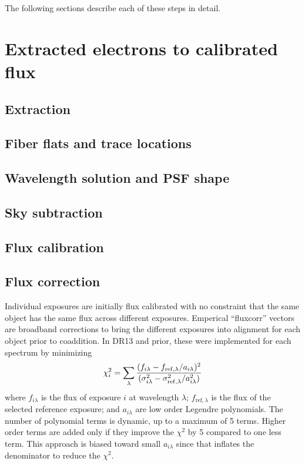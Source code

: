 \documentclass[12pt]{article}
\begin{document}
The following sections describe each of these steps in detail.

\section{Extracted electrons to calibrated flux}

\subsection{Extraction}

\subsection{Fiber flats and trace locations}

\subsection{Wavelength solution and PSF shape}

\subsection{Sky subtraction}

\subsection{Flux calibration}

\subsection{Flux correction}

Individual exposures are initially flux calibrated with no constraint that the same object has the same flux across different exposures.  Emperical ``fluxcorr'' vectors are broadband corrections to bring the different exposures into alignment for each object prior to coaddition.  In DR13 and prior, these were implemented for each spectrum by minimizing
\begin{equation}
    \chi^2_i = \sum_\lambda {
        (f_{i\lambda} - f_{\mathrm{ref},\lambda} / a_{i\lambda} )^2 \over
        (\sigma_{i\lambda}^2 - \sigma_{\mathrm{ref},\lambda}^2 / a_{i\lambda}^2)
        }
\end{equation}
where $f_{i\lambda}$ is the flux of exposure $i$ at wavelength $\lambda$;
$f_{\mathrm{ref},\lambda}$ is the flux of the selected reference exposure;
and $a_{i\lambda}$ are low order Legendre polynomials.
 The number of polynomial terms is dynamic, up to
 a maximum of 5 terms.  Higher order terms are added only if they improve
 the $\chi^2$ by 5 compared to one less term.
This approach is biased toward small $a_{i\lambda}$ since that inflates the denominator to reduce the $\chi^2$.
\end{document}
